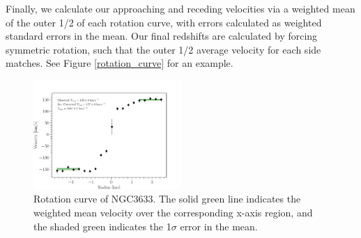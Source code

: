 \documentclass[iop]{emulateapj-rtx4}
\begin{document}
Finally, we calculate our approaching and receding velocities via a weighted mean of the outer 1/2 of each rotation curve, with errors calculated as weighted standard errors in the mean. Our final redshifts are calculated by forcing symmetric rotation, such that the outer 1/2 average velocity for each side matches. See Figure \ref{rotation_curve} for an example.

\begin{figure}[b!]
        \centering
        \vspace{0pt}
        \includegraphics[width=0.50\textwidth]{NGC3633_2_rotation_curve_xphys_helio_vobs_vrotObs_new4.pdf}
        \caption{\small{Rotation curve of NGC3633. The solid green line indicates the weighted mean velocity over the corresponding x-axis region, and the shaded green indicates the 1$\sigma$ error in the mean.}}
        \label{completeness}
\end{figure}
\end{document}

